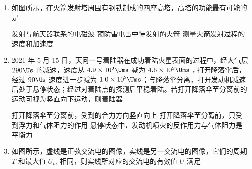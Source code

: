 \documentclass[\gkver]{gaokaozhenti}
\begin{document}
\begin{enumerate}
{	故选 A。
}

\item
如图所示，在火箭发射塔周围有钢铁制成的四座高塔，高塔的功能最有可能的是


{发射与航天器联系的电磁波}
{预防雷电击中待发射的火箭}
{测量火箭发射过程的速度和加速度}


\item
2021 年 5 月 15 日，天问一号着陆器在成功着陆火星表面的过程中，经大气层 $290\Us$ 的减速，速度从 $4.9\times10^{3}\Ums$ 减为 $4.6\times10^{2}\Ums$；打开降落伞后，经过 $90\Us$ 速度进一步减为 $1.0\times10^{2}\Ums$；与降落伞分离，打开发动机减速后处于悬停状态；经过对着陆点的探测后平稳着陆。若打开降落伞至分离前的运动可视为竖直向下运动，则着陆器


{打开降落伞至分离前，受到的合力方向竖直向上}
{打开降落伞至分离前，只受到浮力和气体阻力的作用}
{悬停状态中，发动机喷火的反作用力与气体阻力是平衡力}


\item
如图所示，虚线是正弦交流电的图像，实线是另一交流电的图像，它们的周期 $T$ 和最大值 $U_m$ 相同，则实线所对应的交流电的有效值 $U$ 满足


\end{enumerate}
\end{document}
